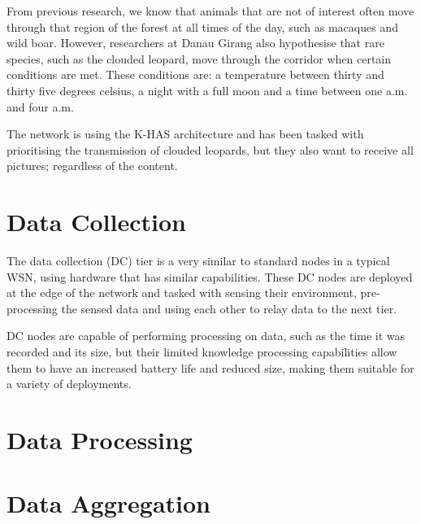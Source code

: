 		From previous research, we know that animals that are not of interest often move through that region of the forest at all times of the day, such as macaques and wild boar. However, researchers at Danau Girang also hypothesise that rare species, such as the clouded leopard, move through the corridor when certain conditions are met. These conditions are: a temperature between thirty and thirty five degrees celsius, a night with a full moon and a time between one a.m. and four a.m.

		The network is using the K-HAS architecture and has been tasked with prioritising the transmission of clouded leopards, but they also want to receive all pictures; regardless of the content.
	
	\section{Data Collection}
		The data collection (DC) tier is a very similar to standard nodes in a typical WSN, using hardware that has similar capabilities. These DC nodes are deployed at the edge of the network and tasked with sensing their environment, pre-processing the sensed data and using each other to relay data to the next tier.

		DC nodes are capable of performing processing on data, such as the time it was recorded and its size, but their limited knowledge processing capabilities allow them to have an increased battery life and reduced size, making them suitable for a variety of deployments.

	\section{Data Processing}

	\section{Data Aggregation}
